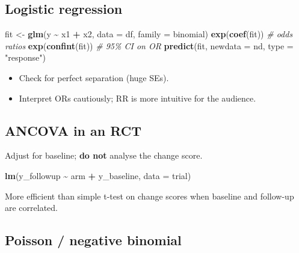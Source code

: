 \documentclass[
]{article}
\newenvironment{Shaded}{\begin{snugshade}}{\end{snugshade}}
\newcommand{\AttributeTok}[1]{\textcolor[rgb]{0.13,0.29,0.53}{#1}}
\newcommand{\CommentTok}[1]{\textcolor[rgb]{0.56,0.35,0.01}{\textit{#1}}}
\newcommand{\FunctionTok}[1]{\textcolor[rgb]{0.13,0.29,0.53}{\textbf{#1}}}
\newcommand{\NormalTok}[1]{#1}
\newcommand{\OtherTok}[1]{\textcolor[rgb]{0.56,0.35,0.01}{#1}}
\newcommand{\SpecialCharTok}[1]{\textcolor[rgb]{0.81,0.36,0.00}{\textbf{#1}}}
\newcommand{\StringTok}[1]{\textcolor[rgb]{0.31,0.60,0.02}{#1}}
\providecommand{\tightlist}{%
  \setlength{\itemsep}{0pt}\setlength{\parskip}{0pt}}
\begin{document}
\subsection{Logistic regression}\label{logistic-regression}

\begin{Shaded}
\begin{Highlighting}[]
\NormalTok{fit }\OtherTok{\textless{}{-}} \FunctionTok{glm}\NormalTok{(y }\SpecialCharTok{\textasciitilde{}}\NormalTok{ x1 }\SpecialCharTok{+}\NormalTok{ x2, }\AttributeTok{data =}\NormalTok{ df, }\AttributeTok{family =}\NormalTok{ binomial)}
\FunctionTok{exp}\NormalTok{(}\FunctionTok{coef}\NormalTok{(fit))                        }\CommentTok{\# odds ratios}
\FunctionTok{exp}\NormalTok{(}\FunctionTok{confint}\NormalTok{(fit))                     }\CommentTok{\# 95\% CI on OR}
\FunctionTok{predict}\NormalTok{(fit, }\AttributeTok{newdata =}\NormalTok{ nd, }\AttributeTok{type =} \StringTok{"response"}\NormalTok{)}
\end{Highlighting}
\end{Shaded}

\begin{itemize}
\tightlist
\item
  Check for perfect separation (huge SEs).
\item
  Interpret ORs cautiously; RR is more intuitive for the audience.
\end{itemize}

\subsection{ANCOVA in an RCT}\label{ancova-in-an-rct}

Adjust for baseline; \textbf{do not} analyse the change score.

\begin{Shaded}
\begin{Highlighting}[]
\FunctionTok{lm}\NormalTok{(y\_followup }\SpecialCharTok{\textasciitilde{}}\NormalTok{ arm }\SpecialCharTok{+}\NormalTok{ y\_baseline, }\AttributeTok{data =}\NormalTok{ trial)}
\end{Highlighting}
\end{Shaded}

More efficient than simple t-test on change scores when baseline and
follow-up are correlated.

\subsection{Poisson / negative
binomial}\label{poisson-negative-binomial}
\end{document}
